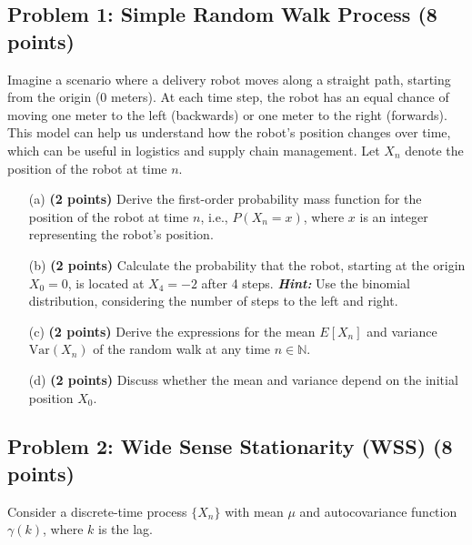 \documentclass{article}
\begin{document}
\subsection*{Problem 1: Simple Random Walk Process (8 points)}
Imagine a scenario where a delivery robot moves along a straight path, starting from the origin (0 meters). At each time step, the robot has an equal chance of moving one meter to the left (backwards) or one meter to the right (forwards). This model can help us understand how the robot's position changes over time, which can be useful in logistics and supply chain management. Let \( X_n \) denote the position of the robot at time \( n \).
\begin{itemize}
    \item[(a)] \textbf{(2 points)} Derive the first-order probability mass function for the position of the robot at time \( n \), i.e., \( P(X_n = x) \), where \( x \) is an integer representing the robot's position.

    \item[(b)] \textbf{(2 points)} Calculate the probability that the robot, starting at the origin \( X_0 = 0 \), is located at \( X_4 = -2 \) after 4 steps. \textbf{\textit{Hint:}} Use the binomial distribution, considering the number of steps to the left and right.

    \item[(c)] \textbf{(2 points)} Derive the expressions for the mean \( E[X_n] \) and variance \( \text{Var}(X_n) \) of the random walk at any time \( n \in \mathbb{N} \).

    \item[(d)] \textbf{(2 points)} Discuss whether the mean and variance depend on the initial position \( X_0 \).
    
\end{itemize}



\subsection*{Problem 2: Wide Sense Stationarity (WSS) (8 points)}

Consider a discrete-time process \( \{X_n\} \) with mean \( \mu \) and autocovariance function \( \gamma(k) \), where \( k \) is the lag.
\end{document}
